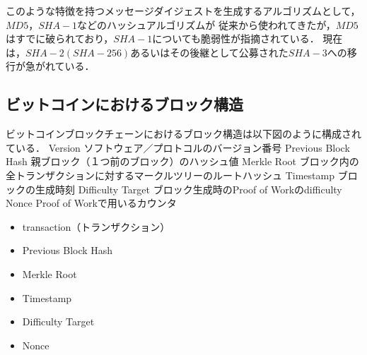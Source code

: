 \documentclass[a4paper,12pt]{jsarticle}
\begin{document}
このような特徴を持つメッセージダイジェストを生成するアルゴリズムとして，$MD5$，$SHA-1$などのハッシュアルゴリズムが
従来から使われてきたが，$MD5$はすでに破られており，$SHA-1$についても脆弱性が指摘されている．
現在は，$SHA-2(SHA-256)$あるいはその後継として公募された$SHA-3$への移行が急がれている．

\subsection{ビットコインにおけるブロック構造}
ビットコインブロックチェーンにおけるブロック構造は以下図のように構成されている．
	Version	ソフトウェア／プロトコルのバージョン番号
	Previous Block Hash	親ブロック（１つ前のブロック）のハッシュ値
	Merkle Root	ブロック内の全トランザクションに対するマークルツリーのルートハッシュ
	Timestamp	ブロックの生成時刻
	Difficulty Target	ブロック生成時のProof of Workのdifficulty
	Nonce	Proof of Workで用いるカウンタ
\begin{itemize}
    \item transaction（トランザクション）
    \item Previous Block Hash
    \item Merkle Root
    \item Timestamp
    \item Difficulty Target
    \item Nonce
\end{itemize}
\end{document}
